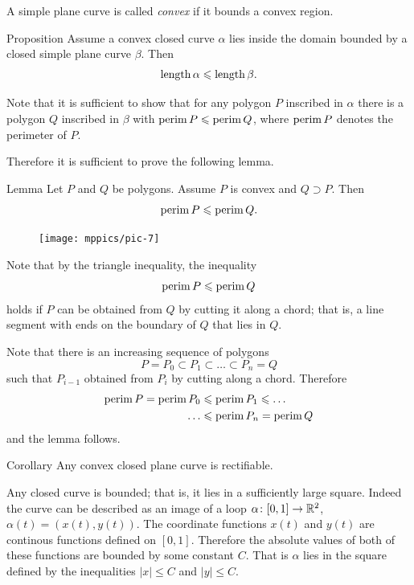 A simple plane curve is called \emph{convex} if it bounds a convex region.

\begin{thm}{Proposition}\label{prop:convex-curve}
Assume a convex closed curve $\alpha$ lies inside the domain bounded by a closed simple plane curve $\beta$.
Then
\[\mathop{\rm length}\nolimits\alpha\leqslant \mathop{\rm length}\nolimits\beta.\]
\end{thm}

Note that it is sufficient to show that for any polygon  $P$ inscribed in $\alpha$ there is a polygon $Q$ inscribed in $\beta$ with 
$\mathop{\rm perim}\nolimits P\leqslant \mathop{\rm perim}\nolimits Q$, where $\mathop{\rm perim}\nolimits P$ denotes the perimeter of $P$.

Therefore it is sufficient to prove the following lemma.


\begin{thm}{Lemma}\label{lem:perimeter}
Let $P$ and $Q$ be polygons.
Assume $P$ is convex and $Q\supset P$.
Then 
\[\mathop{\rm perim}\nolimits P\leqslant \mathop{\rm perim}\nolimits Q.\]

\end{thm}


\begin{figure}
\vskip-4mm
\centering
\texttt{[image: mppics/pic-7]}
\end{figure}

Note that by the triangle inequality,
the inequality
\[\mathop{\rm perim}\nolimits P\leqslant \mathop{\rm perim}\nolimits Q\]
holds
if $P$ can be obtained from $Q$ by cutting it along a chord;
that is, a line segment with ends on the boundary of $Q$ that lies in $Q$.


Note that there is an increasing sequence of polygons 
$$P=P_0\subset P_1\subset\dots\subset P_n=Q$$
such that $P_{i-1}$ obtained from $P_{i}$ by cutting along a chord.
Therefore 
\begin{align*}
\mathop{\rm perim}\nolimits P=\mathop{\rm perim}\nolimits P_0&\leqslant\mathop{\rm perim}\nolimits P_1\leqslant\dots
\\
\dots&\leqslant\mathop{\rm perim}\nolimits P_n=\mathop{\rm perim}\nolimits Q
\end{align*}
and the lemma follows.
\qeds

\begin{thm}{Corollary}
Any convex closed plane curve is rectifiable.  
\end{thm}

Any closed curve is bounded; that is, it lies in a sufficiently large square.
Indeed the curve can be described as an image of a loop $\alpha\colon[0,1]\to\mathbb{R}^2$, $\alpha(t)=(x(t),y(t))$.
The coordinate functions $x(t)$ and $y(t)$ are continous functions defined on $[0,1]$.
Therefore the absolute values of both of these functions are bounded by some constant $C$.
That is $\alpha$ lies in the square defined by the inequalities $|x|\le C$ and $|y|\le C$.

